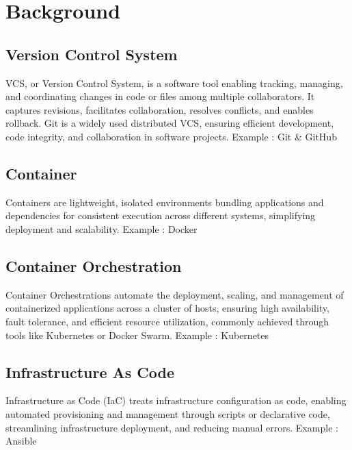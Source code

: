 \documentclass[conference]{IEEEtran}
\begin{document}
\section{Background}

\subsection{Version Control System}

VCS, or Version Control System, is a software tool enabling tracking, managing, and coordinating changes in code or files among multiple collaborators. It captures revisions, facilitates collaboration, resolves conflicts, and enables rollback. Git is a widely used distributed VCS, ensuring efficient development, code integrity, and collaboration in software projects.
Example : Git \& GitHub


\subsection{Container}

Containers are lightweight, isolated environments bundling applications and dependencies for consistent execution across different systems, simplifying deployment and scalability.
Example : Docker

\subsection{Container Orchestration}
Container Orchestrations automate the deployment, scaling, and management of containerized applications across a cluster of hosts, ensuring high availability, fault tolerance, and efficient resource utilization, commonly achieved through tools like Kubernetes or Docker Swarm.
Example : Kubernetes

\subsection{Infrastructure As Code}
Infrastructure as Code (IaC) treats infrastructure configuration as code, enabling automated provisioning and management through scripts or declarative code, streamlining infrastructure deployment, and reducing manual errors.
Example : Ansible
\end{document}
